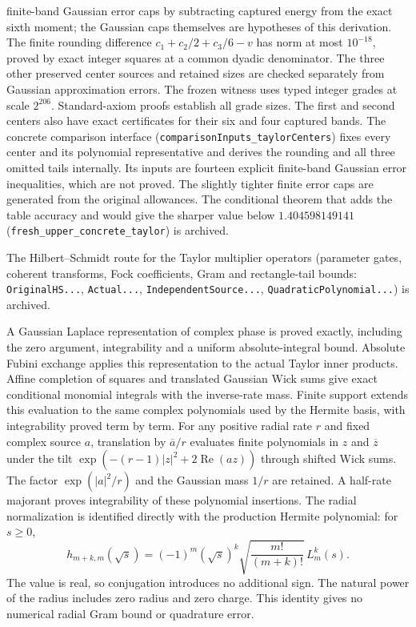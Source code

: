 \documentclass[11pt,a4paper]{article}
\newcommand{\lean}[1]{\texttt{\small #1}}
\begin{document}
finite-band Gaussian error caps by subtracting captured energy from the exact
sixth moment; the Gaussian caps themselves are hypotheses of this derivation.
The finite rounding difference $c_1+c_2/2+c_3/6-v$ has norm at most $10^{-18}$,
proved by exact integer squares at a common dyadic denominator. The three
other preserved center sources and retained sizes are checked separately from
Gaussian approximation errors. The frozen witness uses typed integer grades at
scale $2^{206}$. Standard-axiom proofs establish all grade sizes.
The first and second centers also have exact certificates for their six and
four captured bands. The concrete comparison interface
(\lean{comparisonInputs\_taylorCenters}) fixes every center and
its polynomial representative and derives the rounding and all three omitted
tails internally. Its inputs are fourteen explicit finite-band
Gaussian error inequalities, which are not proved. The
slightly tighter finite error caps are generated from the original allowances.
The conditional theorem that adds the table accuracy and would give the sharper
value below $1.404598149141$ (\lean{fresh\_upper\_concrete\_taylor}) is archived.

\begin{sloppypar}
The Hilbert--Schmidt route for the Taylor multiplier operators (parameter
gates, coherent transforms, Fock coefficients, Gram and rectangle-tail bounds:
\lean{OriginalHS...}, \lean{Actual...}, \lean{IndependentSource...},
\lean{QuadraticPolynomial...}) is archived.
\end{sloppypar}

A Gaussian Laplace representation of complex phase is proved exactly,
including the zero argument, integrability and a uniform absolute-integral
bound. Absolute Fubini exchange applies this representation to the actual
Taylor inner products. Affine completion of squares and translated Gaussian
Wick sums give exact conditional monomial integrals with the inverse-rate mass.
Finite support extends this evaluation to the same complex polynomials used
by the Hermite basis, with integrability proved term by term.
For any positive radial rate $r$ and fixed complex source $a$, translation by
$\overline a/r$ evaluates finite polynomials in $z$ and $\overline z$ under
the tilt $\exp(-(r-1)|z|^2+2\operatorname{Re}(az))$ through shifted Wick sums.
The factor $\exp(|a|^2/r)$ and the Gaussian mass $1/r$ are retained.
A half-rate majorant proves integrability of these polynomial insertions.
The radial normalization is identified directly with the production
Hermite polynomial: for $s\ge0$,
\[
 h_{m+k,m}(\sqrt{s})=(-1)^m(\sqrt{s})^k
 \sqrt{\frac{m!}{(m+k)!}}\,L_m^k(s).
\]
The value is real, so conjugation introduces no additional sign. The natural
power of the radius includes zero radius and zero charge. This identity gives
no numerical radial Gram bound or quadrature error.
\end{document}

